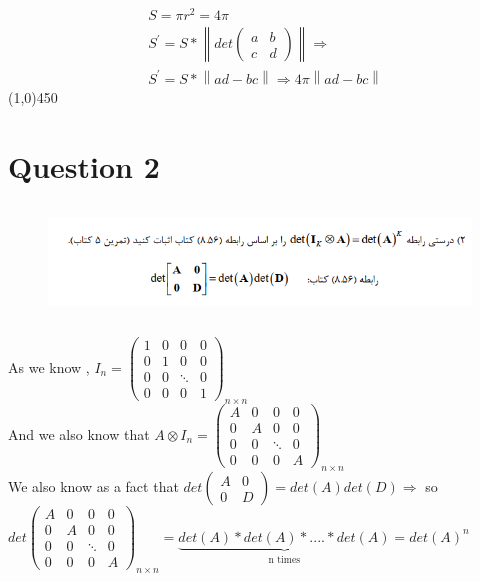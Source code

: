 \documentclass[a4paper,12pt]{article}
\begin{document}
\begin{align*}
	&S = \pi r^2 = 4\pi \\
	&S^\prime = S * \left\| det \begin{pmatrix} a & b\\c & d \end{pmatrix} \right\|  \Rightarrow \\
	&S^\prime = S *\left\| ad - bc \right\| \Rightarrow 4\pi \left\| ad - bc \right\|
\end{align*}
\line(1,0){450}
\newpage
\section {Question 2 }
\begin{figure}[h!]
	\centering
	\includegraphics*[height=3cm]{Q2}
\end{figure}

\begin{doublespace}
	As we know , $ I_n = \begin{pmatrix} 1 & 0 & 0 & 0\\0 & 1 & 0 & 0\\0 & 0 & \ddots & 0\\0 & 0 & 0 & 1 \end{pmatrix}_{n\times n}$ \\
	And we also know that $A \otimes I_n = \begin{pmatrix} A & 0 & 0 & 0\\0 & A & 0 & 0\\0 & 0 & \ddots & 0\\0 & 0 & 0 & A \end{pmatrix}_{n\times n}$\\
	We also know as a fact that $ det\begin{pmatrix} A & 0\\0 & D \end{pmatrix} = det(A)det(D) \Rightarrow $ so \\
	$det\begin{pmatrix} A & 0 & 0 & 0\\0 & A & 0 & 0\\0 & 0 & \ddots & 0\\0 & 0 & 0 & A \end{pmatrix}_{n\times n} =\underbrace{det(A)*det(A)*....*det(A)}_{\text{n times}} = det(A)^n $\\
\end{doublespace}
\end{document}
